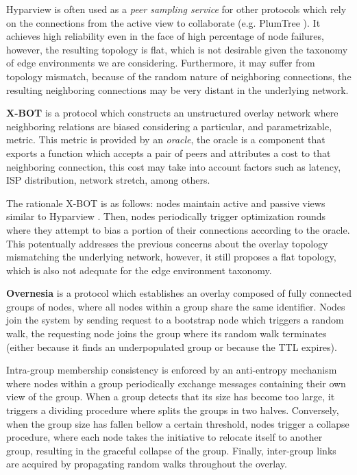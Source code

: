 Hyparview is often used as a \textit{peer sampling service} for other protocols which rely on the connections from the active view to collaborate (e.g. PlumTree \cite{plumTree}). It achieves high reliability even in the face of high percentage of node failures, however, the resulting topology is flat, which is not desirable given the taxonomy of edge environments we are considering. Furthermore, it may suffer from topology mismatch, because of the random nature of neighboring connections, the resulting neighboring connections may be very distant in the underlying network.

\textbf{X-BOT} \cite{x-bot} is a protocol which constructs an unstructured overlay network where neighboring relations are biased  considering a particular, and parametrizable, metric. This metric is provided by an \textit{oracle}, the oracle is a component that exports a function which accepts a pair of peers and attributes a cost to that neighboring connection, this cost may take into account factors such as latency, ISP distribution, network stretch, among others. 

The rationale X-BOT is as follows: nodes maintain active and passive views similar to Hyparview \cite{Hyparview}. Then, nodes periodically trigger optimization rounds where they attempt to bias a portion of their connections according to the oracle. This potentually addresses the previous concerns about the overlay topology mismatching the underlying network, however, it still proposes a flat topology, which is also not adequate for the edge environment taxonomy. 

\textbf{Overnesia} \cite{leitao2014overnesia} is a protocol which establishes an overlay composed of fully connected groups of nodes, where all nodes within a group share the same identifier. Nodes join the system by sending request to a bootstrap node which triggers a random walk, the requesting node joins the group where its random walk terminates (either because it finds an underpopulated group or because the TTL expires). 

Intra-group membership consistency is enforced by an anti-entropy mechanism where nodes within a group periodically exchange messages containing their own view of the group. When a group detects that its size has become too large, it triggers a dividing procedure where splits the groups in two halves. Conversely, when the group size has fallen bellow a certain threshold, nodes trigger a collapse procedure, where each node takes the initiative to relocate itself to another group, resulting in the graceful collapse of the group. Finally, inter-group links are acquired by propagating random walks throughout the overlay.

